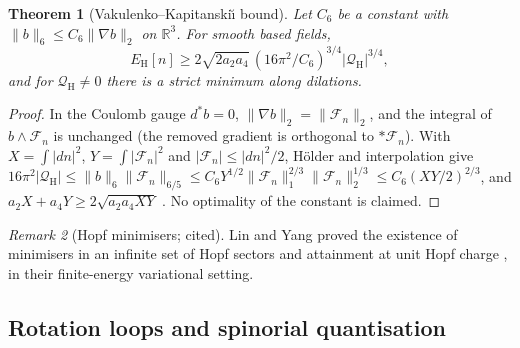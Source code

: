 \documentclass[aps,pra,onecolumn,superscriptaddress,nofootinbib,10pt]{revtex4-2}
\newtheorem{theorem}{Theorem}
\theoremstyle{definition}
\theoremstyle{remark}
\newtheorem{remark}[theorem]{Remark}
\newcommand{\R}{\mathbb{R}}
\begin{document}
\begin{theorem}[Vakulenko--Kapitanski\u{\i} bound]\label{thm:vk}
Let $C_6$ be a constant with $\lVert b\rVert_6\le C_6\lVert\nabla b\rVert_2$ on $\R^3$.  For smooth based fields,
\[
E_{\mathrm H}[n]\ge2\sqrt{2a_2a_4}\,(16\pi^2/C_6)^{3/4}\lvert\mathcal Q_{\mathrm H}\rvert^{3/4},
\]
and for $\mathcal Q_{\mathrm H}\ne0$ there is a strict minimum along dilations.
\end{theorem}
\begin{proof}
In the Coulomb gauge $d^*b=0$, $\lVert\nabla b\rVert_2=\lVert\mathcal F_n\rVert_2$, and the integral of $b\wedge\mathcal F_n$ is unchanged (the removed gradient is
orthogonal to $*\mathcal F_n$).  With $X=\int\lvert dn\rvert^2$, $Y=\int\lvert\mathcal F_n\rvert^2$ and $\lvert\mathcal F_n\rvert\le\lvert dn\rvert^2/2$, H\"older and interpolation give
$16\pi^2\lvert\mathcal Q_{\mathrm H}\rvert\le\lVert b\rVert_6\lVert\mathcal F_n\rVert_{6/5}\le C_6Y^{1/2}\lVert\mathcal F_n\rVert_1^{2/3}\lVert\mathcal F_n\rVert_2^{1/3}\le C_6(XY/2)^{2/3}$, and $a_2X+a_4Y\ge2\sqrt{a_2a_4XY}$
\cite{n6:vk-original}.  No optimality of the constant is claimed.
\end{proof}
\begin{remark}[Hopf minimisers; cited]\label{rem:linyang}
Lin and Yang proved the existence of minimisers in an infinite set of Hopf sectors \cite{n6:lin-yang} and
attainment at unit Hopf charge \cite{n6:lin-yang2}, in their finite-energy variational setting.
\end{remark}

\subsection{Rotation loops and spinorial quantisation}
\end{document}
